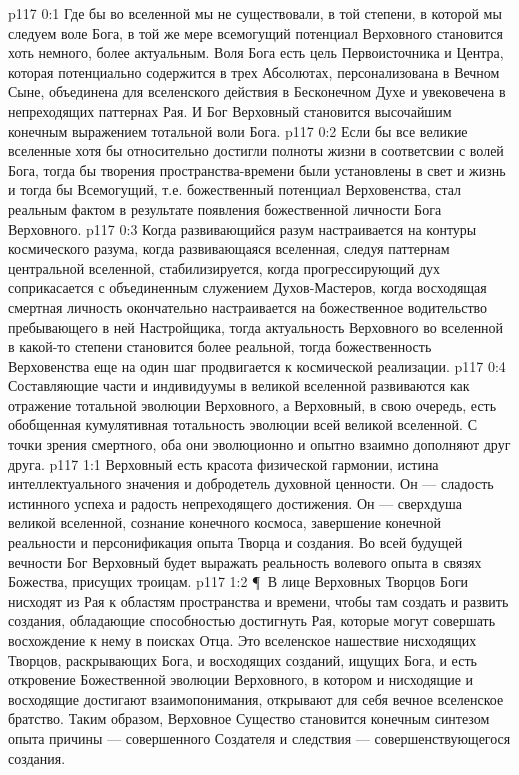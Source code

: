 \vs p117 0:1 Где бы во вселенной мы не существовали, в той степени, в которой мы следуем воле Бога, в той же мере всемогущий потенциал Верховного становится хоть немного, более актуальным. Воля Бога есть цель Первоисточника и Центра, которая потенциально содержится в трех Абсолютах, персонализована в Вечном Сыне, объединена для вселенского действия в Бесконечном Духе и увековечена в непреходящих паттернах Рая. И Бог Верховный становится высочайшим конечным выражением тотальной воли Бога.
\vs p117 0:2 Если бы все великие вселенные хотя бы относительно достигли полноты жизни в соответсвии с волей Бога, тогда бы творения пространства\hyp{}времени были установлены в свет и жизнь и тогда бы Всемогущий, т.е. божественный потенциал Верховенства, стал реальным фактом в результате появления божественной личности Бога Верховного.
\vs p117 0:3 Когда развивающийся разум настраивается на контуры космического разума, когда развивающаяся вселенная, следуя паттернам центральной вселенной, стабилизируется, когда прогрессирующий дух соприкасается с объединенным служением Духов\hyp{}Мастеров, когда восходящая смертная личность окончательно настраивается на божественное водительство пребывающего в ней Настройщика, тогда актуальность Верховного во вселенной в какой\hyp{}то степени становится более реальной, тогда божественность Верховенства еще на один шаг продвигается к космической реализации.
\vs p117 0:4 Составляющие части и индивидуумы в великой вселенной развиваются как отражение тотальной эволюции Верховного, а Верховный, в свою очередь, есть обобщенная кумулятивная тотальность эволюции всей великой вселенной. С точки зрения смертного, оба они эволюционно и опытно взаимно дополняют друг друга.
\vs p117 1:1 Верховный есть красота физической гармонии, истина интеллектуального значения и добродетель духовной ценности. Он --- сладость истинного успеха и радость непреходящего достижения. Он --- сверхдуша великой вселенной, сознание конечного космоса, завершение конечной реальности и персонификация опыта Творца и создания. Во всей будущей вечности Бог Верховный будет выражать реальность волевого опыта в связях Божества, присущих троицам.
\vs p117 1:2 \P\ В лице Верховных Творцов Боги нисходят из Рая к областям пространства и времени, чтобы там создать и развить создания, обладающие способностью достигнуть Рая, которые могут совершать восхождение к нему в поисках Отца. Это вселенское нашествие нисходящих Творцов, раскрывающих Бога, и восходящих созданий, ищущих Бога, и есть откровение Божественной эволюции Верховного, в котором и нисходящие и восходящие достигают взаимопонимания, открывают для себя вечное вселенское братство. Таким образом, Верховное Существо становится конечным синтезом опыта причины --- совершенного Создателя и следствия --- совершенствующегося создания.
